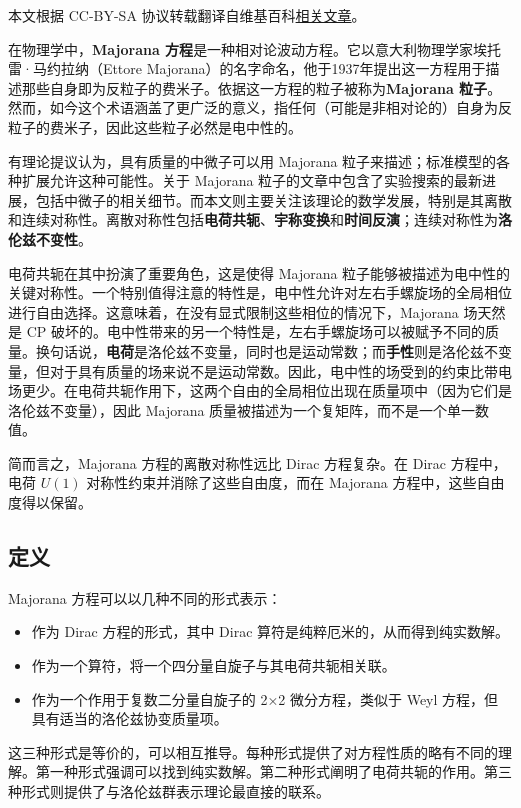 
本文根据 CC-BY-SA 协议转载翻译自维基百科\href{https://en.wikipedia.org/wiki/Majorana_equation}{相关文章}。

在物理学中，\textbf{Majorana 方程}是一种相对论波动方程。它以意大利物理学家埃托雷·马约拉纳（Ettore Majorana）的名字命名，他于1937年提出这一方程用于描述那些自身即为反粒子的费米子。依据这一方程的粒子被称为\textbf{Majorana 粒子}。然而，如今这个术语涵盖了更广泛的意义，指任何（可能是非相对论的）自身为反粒子的费米子，因此这些粒子必然是电中性的。

有理论提议认为，具有质量的中微子可以用 Majorana 粒子来描述；标准模型的各种扩展允许这种可能性。关于 Majorana 粒子的文章中包含了实验搜索的最新进展，包括中微子的相关细节。而本文则主要关注该理论的数学发展，特别是其离散和连续对称性。离散对称性包括\textbf{电荷共轭}、\textbf{宇称变换}和\textbf{时间反演}；连续对称性为\textbf{洛伦兹不变性}。

电荷共轭在其中扮演了重要角色，这是使得 Majorana 粒子能够被描述为电中性的关键对称性。一个特别值得注意的特性是，电中性允许对左右手螺旋场的全局相位进行自由选择。这意味着，在没有显式限制这些相位的情况下，Majorana 场天然是 CP 破坏的。电中性带来的另一个特性是，左右手螺旋场可以被赋予不同的质量。换句话说，\textbf{电荷}是洛伦兹不变量，同时也是运动常数；而\textbf{手性}则是洛伦兹不变量，但对于具有质量的场来说不是运动常数。因此，电中性的场受到的约束比带电场更少。在电荷共轭作用下，这两个自由的全局相位出现在质量项中（因为它们是洛伦兹不变量），因此 Majorana 质量被描述为一个复矩阵，而不是一个单一数值。

简而言之，Majorana 方程的离散对称性远比 Dirac 方程复杂。在 Dirac 方程中，电荷 
\( U(1) \) 对称性约束并消除了这些自由度，而在 Majorana 方程中，这些自由度得以保留。
\subsection{定义} 
Majorana 方程可以以几种不同的形式表示：
\begin{itemize}
\item 作为 Dirac 方程的形式，其中 Dirac 算符是纯粹厄米的，从而得到纯实数解。  
\item 作为一个算符，将一个四分量自旋子与其电荷共轭相关联。  
\item 作为一个作用于复数二分量自旋子的 2×2 微分方程，类似于 Weyl 方程，但具有适当的洛伦兹协变质量项。
\end{itemize}  
这三种形式是等价的，可以相互推导。每种形式提供了对方程性质的略有不同的理解。第一种形式强调可以找到纯实数解。第二种形式阐明了电荷共轭的作用。第三种形式则提供了与洛伦兹群表示理论最直接的联系。
